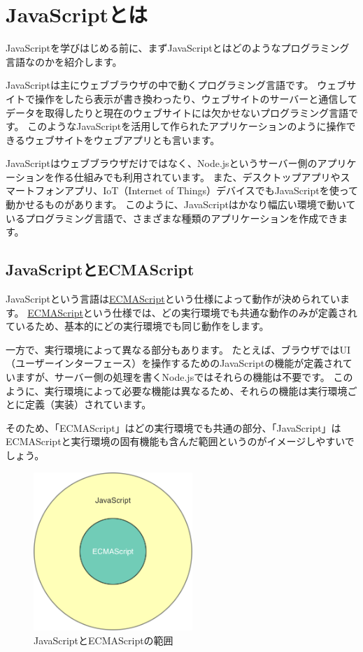 \hypertarget{what-is-javascript}{%
\chapter{JavaScriptとは}\label{what-is-javascript}}
\thispagestyle{frontheadings}

JavaScriptを学びはじめる前に、まずJavaScriptとはどのようなプログラミング言語なのかを紹介します。

JavaScriptは主にウェブブラウザの中で動くプログラミング言語です。
ウェブサイトで操作をしたら表示が書き換わったり、ウェブサイトのサーバーと通信してデータを取得したりと現在のウェブサイトには欠かせないプログラミング言語です。
このようなJavaScriptを活用して作られたアプリケーションのように操作できるウェブサイトをウェブアプリとも言います。

JavaScriptはウェブブラウザだけではなく、Node.jsというサーバー側のアプリケーションを作る仕組みでも利用されています。
また、デスクトップアプリやスマートフォンアプリ、IoT（Internet of
Things）デバイスでもJavaScriptを使って動かせるものがあります。
このように、JavaScriptはかなり幅広い環境で動いているプログラミング言語で、さまざまな種類のアプリケーションを作成できます。

\hypertarget{javascript-ecmascript}{%
\section{JavaScriptとECMAScript}\label{javascript-ecmascript}}

JavaScriptという言語は\href{../ecmascript/README.md}{ECMAScript}という仕様によって動作が決められています。
\href{../ecmascript/README.md}{ECMAScript}という仕様では、どの実行環境でも共通な動作のみが定義されているため、基本的にどの実行環境でも同じ動作をします。

一方で、実行環境によって異なる部分もあります。
たとえば、ブラウザではUI（ユーザーインターフェース）を操作するためのJavaScriptの機能が定義されていますが、サーバー側の処理を書くNode.jsではそれらの機能は不要です。
このように、実行環境によって必要な機能は異なるため、それらの機能は実行環境ごとに定義（実装）されています。

そのため、「ECMAScript」はどの実行環境でも共通の部分、「JavaScript」はECMAScriptと実行環境の固有機能も含んだ範囲というのがイメージしやすいでしょう。

\begin{figure}
\centering
\includegraphics[width=60mm]{./fig/javascript-ecmascript.png}
\caption{JavaScriptとECMAScriptの範囲}
\end{figure}

